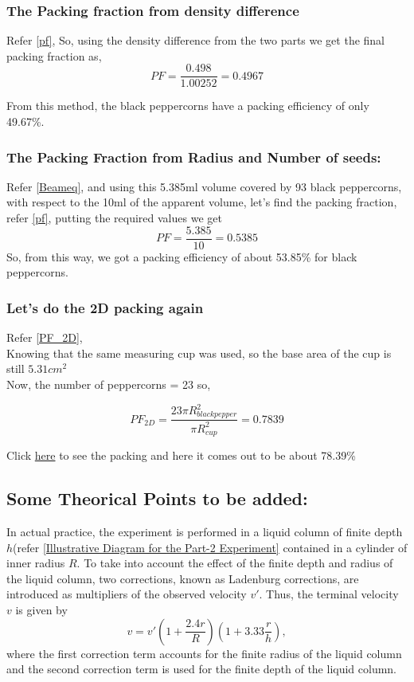 \documentclass[twocolumn,11pt]{article}
\begin{document}
\subsubsection{The Packing fraction from density difference}
Refer \eqref{pf},
So, using the density difference from the two parts we get the final packing fraction as,
$$PF = \frac{0.498}{1.00252}= 0.4967$$

From this method, the black peppercorns have a packing efficiency of only 49.67\%.

\subsubsection{The Packing Fraction from Radius and Number of seeds:}
Refer \eqref{Beameq}, and using this 5.385ml volume covered by 93 black peppercorns, with respect to
the 10ml of the apparent volume, let’s find the
packing fraction,
refer \eqref{pf}, putting the required values we get
$$PF = \frac{5.385}{10} = 0.5385$$
So, from this way, we got a packing efficiency of about 53.85\% for black peppercorns.
\subsubsection{Let's do the 2D packing again}
Refer \eqref{PF_2D},\\
Knowing that the same measuring cup was used, so the base area of the cup is still $5.31 cm^2$\\
Now, the number of peppercorns = 23
so,

$$PF_{2D} = \frac{23\pi R_{black pepper}^2}{\pi R_{cup}^2}= 0.7839$$

Click \href{https://drive.google.com/file/d/1s73ig5K-jH7DYv54-HVJCJj_UxN6Z78_/view?usp=drive_link}{here} to see the packing and here it comes out to be about 78.39\%

\subsection{Some Theorical Points to be added:}

In actual practice, the experiment is performed in a liquid column of finite depth $h$(refer \eqref{Illustrative Diagram for the Part-2 Experiment} contained in a cylinder of inner radius $R$. To take into account the effect of the finite depth and radius of the liquid column, two corrections, known as Ladenburg corrections, are introduced as multipliers of the observed velocity $v'$. Thus, the terminal velocity $v$ is given by
\begin{equation}
\label{Ladenburg}
v = v' \left(1+ \frac{2.4r}{R} \right) \left( 1+ 3.33\frac{r}{h} \right),
\end{equation}
where the first correction term accounts for the finite radius of the liquid column and the second correction term is used for the finite depth of the liquid column. 
\end{document}
